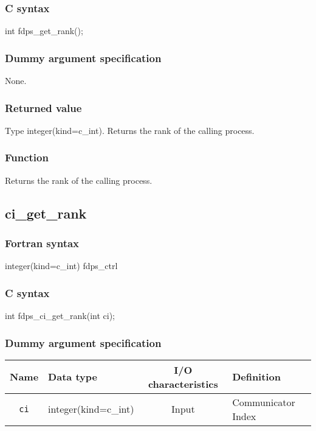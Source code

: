 \subsubsection*{C syntax}
\begin{screen}
\begin{spverbatim}
int fdps_get_rank();
\end{spverbatim}
\end{screen}

\subsubsection*{Dummy argument specification}
None.

\subsubsection*{Returned value}
Type integer(kind=c\_int). Returns the rank of the calling process.

\subsubsection*{Function}
Returns the rank of the calling process.
\clearpage

\subsection{ci\_get\_rank}
\subsubsection*{Fortran syntax}
\begin{screen}
\begin{spverbatim}
integer(kind=c_int) fdps_ctrl%
\end{spverbatim}
\end{screen}

\subsubsection*{C syntax}
\begin{screen}
\begin{spverbatim}
int fdps_ci_get_rank(int ci);
\end{spverbatim}
\end{screen}

\subsubsection*{Dummy argument specification}
\begin{table}[h]
\begin{tabularx}{\linewidth}{cXcX}
\toprule
\rowcolor{Snow2}
Name & Data type & I/O characteristics & Definition \\
\midrule
\verb|ci| & integer(kind=c\_int) & Input & Communicator Index\\
\bottomrule
\end{tabularx}
\end{table}


